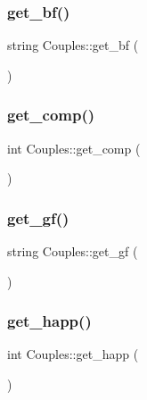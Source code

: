 \subsubsection{\texorpdfstring{get\+\_\+bf()}{get\_bf()}}
{\footnotesize\ttfamily string Couples\+::get\+\_\+bf (\begin{DoxyParamCaption}{ }\end{DoxyParamCaption})}

\mbox{\label{classCouples_ac9dc3a7bdc55ab8f57b6614ebe2a892f}} 
\subsubsection{\texorpdfstring{get\+\_\+comp()}{get\_comp()}}
{\footnotesize\ttfamily int Couples\+::get\+\_\+comp (\begin{DoxyParamCaption}{ }\end{DoxyParamCaption})}

\mbox{\label{classCouples_a8a6329985b00c3a1ee5e4f7ff95736c1}} 
\subsubsection{\texorpdfstring{get\+\_\+gf()}{get\_gf()}}
{\footnotesize\ttfamily string Couples\+::get\+\_\+gf (\begin{DoxyParamCaption}{ }\end{DoxyParamCaption})}

\mbox{\label{classCouples_a374a87b110d0a447324c0c95634226c7}} 
\subsubsection{\texorpdfstring{get\+\_\+happ()}{get\_happ()}}
{\footnotesize\ttfamily int Couples\+::get\+\_\+happ (\begin{DoxyParamCaption}{ }\end{DoxyParamCaption})}

\mbox{\label{classCouples_a87a778cca81a7840f04069bdfc30e487}} 

